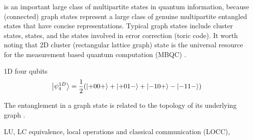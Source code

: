  is an important large class of multipartite states in quantum information,
because (connected) graph states represent a large class of genuine multipartite entangled states that have concise representations.
Typical graph states include cluster states,  states, and the states involved in error correction (toric code).
It worth noting that 2D cluster (rectangular lattice graph) state is the universal resource for the measurement based quantum computation (MBQC) \cite{briegelMeasurementbasedQuantumComputation2009}.
\begin{definition}\label{def:cluster_state}
	1D four qubits
	\begin{equation}
		\ket{\psi_4^{1D}} = \frac{1}{2} \qty(
			\ket{+00+} + \ket{+01-} + \ket{-10+} - \ket{-11-}
		)
	\end{equation}
\end{definition}
	The entanglement in a graph state is related to the topology of its underlying graph \cite{heinEntanglementGraphStates2006}.
\begin{remark}
	LU, LC equivalence, local operations and classical communication (LOCC), 
\end{remark}
